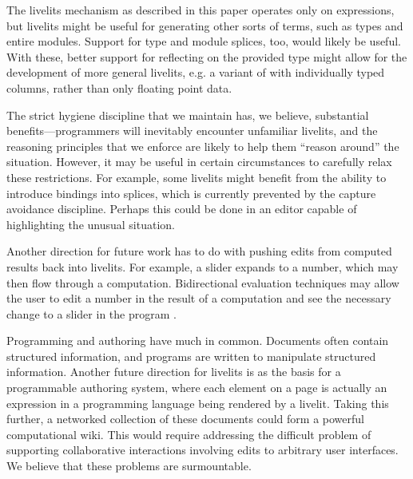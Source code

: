   The livelits mechanism as described in this paper operates only on expressions,
  but livelits might be useful for generating other sorts of terms, such as types
  and entire modules. Support for type and module splices, too, would likely be useful.
  With these, better support for reflecting on the provided type might allow for 
  the development of more general livelits, e.g. a variant of  
  with individually typed columns, rather than only floating point data.

  The strict hygiene discipline that we maintain has, we believe, substantial 
  benefits---programmers will inevitably encounter unfamiliar livelits, and 
  the reasoning principles that we enforce are likely to help them ``reason around''
  the situation. However, it may be useful in certain circumstances to carefully
  relax these restrictions. For example, some livelits might benefit from the 
  ability to introduce bindings into splices, which is currently prevented by 
  the capture avoidance discipline. Perhaps this could be done in an 
  editor capable of highlighting the unusual situation.

  Another direction for future work has to do with pushing edits from computed results
  back into livelits. For example, a slider expands to a number, which may 
  then flow through a computation. Bidirectional evaluation techniques may allow
  the user to edit a number in the result of a computation and see the necessary
  change to a slider in the program \cite{sns-pldi,sns-uist}.

  Programming and authoring have much in common. Documents often contain structured
  information, and programs are written to manipulate structured information.
  Another future direction for livelits is as the basis for a programmable authoring 
  system, where each element on a page is actually an expression in a programming language
  being rendered by a livelit. Taking this further, a networked collection of these
  documents could form a powerful computational wiki. This would 
  require addressing the difficult problem of supporting collaborative interactions 
  involving edits to arbitrary user interfaces. 
  We believe that these problems are surmountable.


